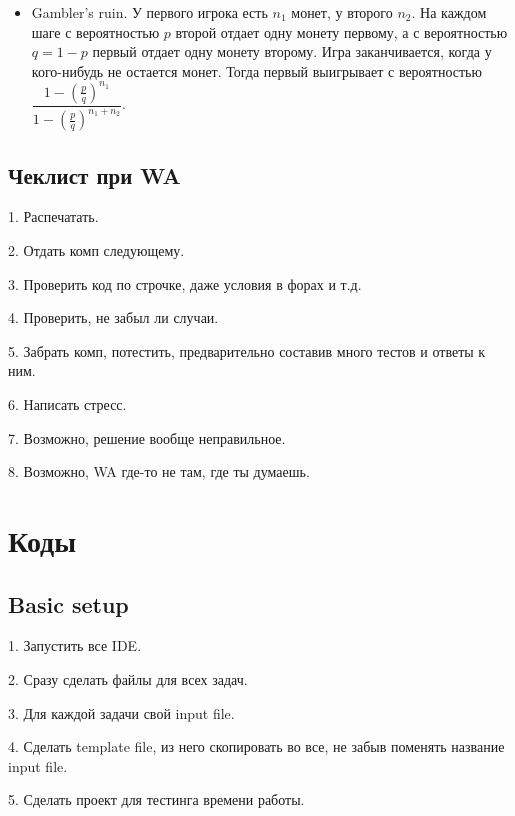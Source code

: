 \documentclass[10pt, portrait,letterpaper]{article}
\begin{document}
\begin{itemize}
{\begin{center}
\end{center}
}
    
    \item Gambler's ruin. У первого игрока есть $n_1$ монет, у второго $n_2$. На каждом шаге с вероятностью $p$ второй отдает одну монету первому, а с вероятностью $q = 1 - p$ первый отдает одну монету второму. Игра заканчивается, когда у кого-нибудь не остается монет. Тогда первый выигрывает с вероятностью
$
\dfrac{1 - \left(\frac{p}{q}\right)^{n_1}}{1 - \left(\frac{p}{q}\right)^{n_1 + n_2}}.
$

\end{itemize}

\subsection{Чеклист при WA}

1. Распечатать.

2. Отдать комп следующему.

3. Проверить код по строчке, даже условия в форах и т.д.

4. Проверить, не забыл ли случаи.

5. Забрать комп, потестить, предварительно составив много тестов и ответы к ним.

6. Написать стресс.

7. Возможно, решение вообще неправильное.

8. Возможно, WA где-то не там, где ты думаешь.

\section{Коды}

\subsection{Basic setup}

1. Запустить все IDE.

2. Сразу сделать файлы для всех задач.

3. Для каждой задачи свой input file.

4. Сделать template file, из него скопировать во все, не забыв поменять название input file.

5. Сделать проект для тестинга времени работы.
\end{document}
